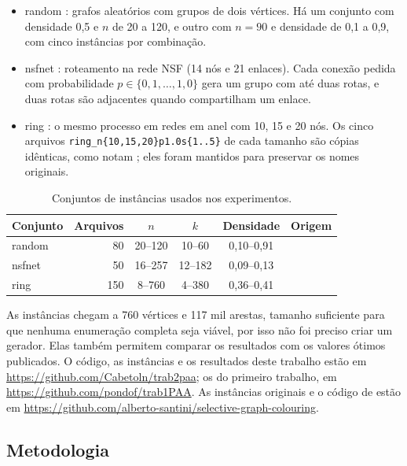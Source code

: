 \documentclass[12pt]{article}
\begin{document}
\begin{itemize}
  \item random \cite{frota2010}: grafos aleatórios com grupos de dois
    vértices. Há um conjunto com densidade 0,5 e $n$ de 20 a 120, e outro com
    $n=90$ e densidade de 0,1 a 0,9, com cinco instâncias por combinação.
  \item nsfnet \cite{li2000}: roteamento na rede NSF (14 nós e 21 enlaces).
    Cada conexão pedida com probabilidade $p\in\{0{,}1,\dots,1{,}0\}$ gera um
    grupo com até duas rotas, e duas rotas são adjacentes quando compartilham
    um enlace.
  \item ring \cite{frota2010}: o mesmo processo em redes em anel com 10, 15 e
    20 nós. Os cinco arquivos \texttt{ring\_n\{10,15,20\}p1.0s\{1..5\}} de cada
    tamanho são cópias idênticas, como notam \cite{furini2018}; eles foram
    mantidos para preservar os nomes originais.
\end{itemize}

\begin{table}[ht]
  \centering
  \caption{Conjuntos de instâncias usados nos experimentos.}
  \label{tab:instancias}
  \begin{tabular}{lrcccl}
    \toprule
    Conjunto & Arquivos & $n$ & $k$ & Densidade & Origem \\
    \midrule
    random & 80  & 20--120 & 10--60  & 0,10--0,91 & \cite{frota2010} \\
    nsfnet & 50  & 16--257 & 12--182 & 0,09--0,13 & \cite{li2000} \\
    ring   & 150 & 8--760  & 4--380  & 0,36--0,41 & \cite{frota2010} \\
    \bottomrule
  \end{tabular}
\end{table}

As instâncias chegam a 760 vértices e 117 mil arestas, tamanho suficiente para
que nenhuma enumeração completa seja viável, por isso não foi preciso criar um
gerador. Elas também permitem comparar os resultados com os valores ótimos
publicados. O código, as instâncias e os resultados deste trabalho estão em
\url{https://github.com/Cabetoln/trab2paa}; os do primeiro trabalho, em
\url{https://github.com/pondof/trab1PAA}. As instâncias originais e o código
de \cite{furini2018} estão em
\url{https://github.com/alberto-santini/selective-graph-colouring}.

\subsection{Metodologia}
\end{document}
